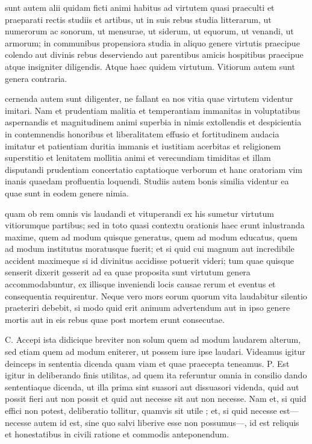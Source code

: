 sunt autem alii quidam ficti animi habitus ad virtutem quasi praeculti et praeparati rectis studiis et artibus, ut in suis rebus studia litterarum, ut numerorum ac sonorum, ut mensurae, ut siderum, ut equorum, ut venandi, ut armorum; in communibus propensiora studia in aliquo genere virtutis praecipue colendo aut divinis rebus deserviendo aut parentibus amicis hospitibus praecipue atque insigniter diligendis. Atque haec quidem virtutum. Vitiorum autem sunt genera contraria.

 cernenda autem sunt diligenter, ne fallant ea nos vitia quae virtutem videntur imitari. Nam et prudentiam malitia et temperantiam immanitas in voluptatibus aspernandis et magnitudinem animi superbia in nimis extollendis et despicientia in contemnendis honoribus et liberalitatem effusio et fortitudinem audacia imitatur et patientiam duritia immanis et iustitiam acerbitas et religionem superstitio et lenitatem mollitia animi et verecundiam timiditas et illam disputandi prudentiam concertatio captatioque verborum et hanc oratoriam vim inanis quaedam profluentia loquendi. Studiis autem bonis similia videntur ea quae sunt in eodem genere nimia.

 quam ob rem omnis vis laudandi et vituperandi ex his sumetur virtutum vitiorumque partibus; sed in toto quasi contextu orationis haec erunt inlustranda maxime, quem ad modum quisque generatus, quem ad modum educatus, quem ad modum institutus moratusque fuerit; et si quid cui magnum aut incredibile accident maximeque si id divinitus accidisse potuerit videri; tum quae quisque senserit dixerit gesserit ad ea quae proposita sunt virtutum genera accommodabuntur, ex illisque inveniendi locis causae rerum et eventus et consequentia requirentur. Neque vero mors eorum quorum vita laudabitur silentio praeteriri debebit, si modo quid erit animum advertendum aut in ipso genere mortis aut in eis rebus quae post mortem erunt consecutae.

 C. Accepi ista didicique breviter non solum quem ad modum laudarem alterum, sed etiam quem ad modum eniterer, ut possem iure ipse laudari. Videamus igitur deinceps in sententia dicenda quam viam et quae praecepta teneamus. P. Est igitur in deliberando finis utilitas, ad quem ita referuntur omnia in consilio dando sententiaque dicenda, ut illa prima sint suasori aut dissuasori videnda, quid aut possit fieri aut non possit et quid aut necesse sit aut non necesse. Nam et, si quid effici non potest, deliberatio tollitur, quamvis sit utile ; et, si quid necesse est— necesse autem id est, sine quo salvi liberive esse non possumus—, id est reliquis et honestatibus in civili ratione et commodis anteponendum.

